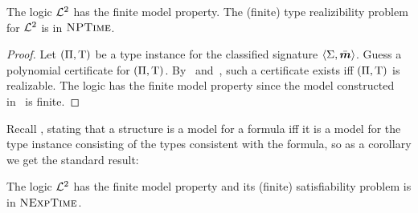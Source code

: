 \begin{proposition}
The logic $\mathcal{L}^{2}$ has the finite model property. The (finite) type realizibility
problem for $\mathcal{L}^{2}$ is in $\text{\normalfont{\scshape NPTime}}$.
\end{proposition}
\begin{proof}
Let $(\Pi,\mathrm{T})$ be a type instance for the classified signature
$\left\langle \mathrm{\Sigma},\bar{\bm{m}} \right\rangle$. Guess a polynomial certificate for $(\Pi,\mathrm{T})$.
By~ and~, such a certificate exists
iff $(\Pi,\mathrm{T})$ is realizable.
The logic has the finite model property since the model constructed
in~ is finite.
\end{proof}
Recall , stating that a structure is a model for a
formula iff it is a model for the type instance consisting of the types
consistent with the formula, so as a corollary we get the standard result:
\begin{corollary}
The logic $\mathcal{L}^{2}$ has the finite model property and its (finite) satisfiability
problem is in $\text{\normalfont{\scshape NExpTime}}$.
\end{corollary}